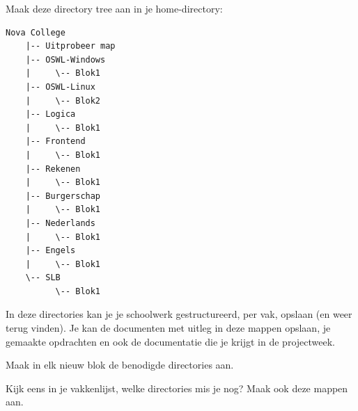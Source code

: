 Maak deze directory tree aan in je home-directory:
\begin{verbatim}
Nova College
    |-- Uitprobeer map
    |-- OSWL-Windows
    |     \-- Blok1
    |-- OSWL-Linux
    |     \-- Blok2
    |-- Logica
    |     \-- Blok1
    |-- Frontend
    |     \-- Blok1
    |-- Rekenen
    |     \-- Blok1
    |-- Burgerschap
    |     \-- Blok1
    |-- Nederlands
    |     \-- Blok1
    |-- Engels
    |     \-- Blok1
    \-- SLB
          \-- Blok1
\end{verbatim}
In deze directories kan je je schoolwerk gestructureerd, per vak, opslaan (en weer terug vinden). Je kan de documenten met uitleg in deze mappen opslaan, je gemaakte opdrachten en ook de documentatie die je krijgt in de projectweek.

Maak in elk nieuw blok de benodigde directories aan.

Kijk eens in je vakkenlijst, welke directories mis je nog? Maak ook deze mappen aan.


